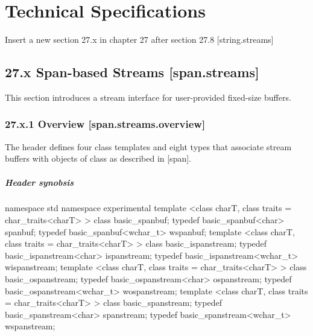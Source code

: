 \documentclass[ebook,11pt,article]{memoir}
\begin{document}
\chapter{Technical Specifications}
Insert a new section 27.x in chapter 27 after section 27.8 [string.streams]

\section{27.x Span-based Streams [span.streams]}
This section introduces a stream interface for user-provided fixed-size buffers. 
\subsection{27.x.1 Overview [span.streams.overview]}
The header  defines four class templates and eight types that associate stream buffers with objects of class  as described in [span].

\paragraph{Header  synobsis}

\begin{codeblock}
namespace std {
namespace experimental {
  template <class charT, class traits = char_traits<charT> >
    class basic_spanbuf;
  typedef basic_spanbuf<char>     spanbuf;
  typedef basic_spanbuf<wchar_t> wspanbuf;
  template <class charT, class traits = char_traits<charT> >
    class basic_ispanstream;
  typedef basic_ispanstream<char>     ispanstream;
  typedef basic_ispanstream<wchar_t> wispanstream;
  template <class charT, class traits = char_traits<charT> >
    class basic_ospanstream;
  typedef basic_ospanstream<char>     ospanstream;
  typedef basic_ospanstream<wchar_t> wospanstream;
  template <class charT, class traits = char_traits<charT> >
    class basic_spanstream;
  typedef basic_spanstream<char>     spanstream;
  typedef basic_spanstream<wchar_t> wspanstream;
}}
\end{codeblock}
\end{document}
